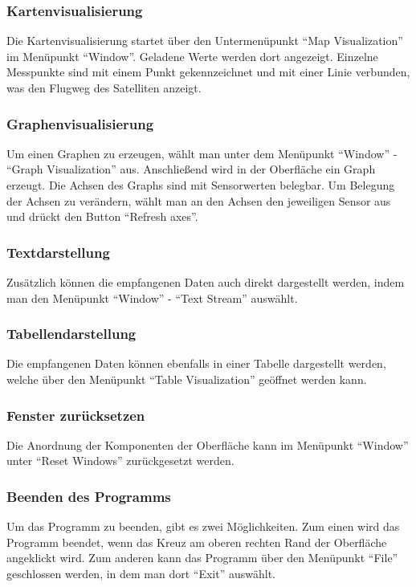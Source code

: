 \subsubsection{Kartenvisualisierung}
Die Kartenvisualisierung startet über den Untermenüpunkt ``Map Visualization'' im Menüpunkt ``Window''. Geladene Werte werden dort angezeigt. Einzelne Messpunkte sind mit einem Punkt gekennzeichnet und mit einer Linie verbunden, was den Flugweg des Satelliten anzeigt.
\subsubsection{Graphenvisualisierung}
Um einen Graphen zu erzeugen, wählt man unter dem Menüpunkt ``Window'' - ``Graph Visualization'' aus. Anschließend wird in der Oberfläche ein Graph erzeugt. Die Achsen des Graphs sind mit Sensorwerten belegbar. Um Belegung der Achsen zu verändern, wählt man an den Achsen den jeweiligen Sensor aus und drückt den Button ``Refresh axes''.

\subsubsection{Textdarstellung}
Zusätzlich können die empfangenen Daten auch direkt dargestellt werden, indem man den Menüpunkt ``Window'' - ``Text Stream'' auswählt.

\subsubsection {Tabellendarstellung}
Die empfangenen Daten können ebenfalls in einer Tabelle dargestellt werden, welche über den Menüpunkt ``Table Visualization'' geöffnet werden kann.

\subsubsection{Fenster zurücksetzen}
Die Anordnung der Komponenten der Oberfläche kann im Menüpunkt ``Window'' unter ``Reset Windows'' zurückgesetzt werden.

\subsubsection{Beenden des Programms}
Um das Programm zu beenden, gibt es zwei Möglichkeiten. Zum einen wird das Programm beendet, wenn das Kreuz am oberen rechten Rand der Oberfläche angeklickt wird. Zum anderen kann das Programm über den Menüpunkt ``File'' geschlossen werden, in dem man dort ``Exit'' auswählt.